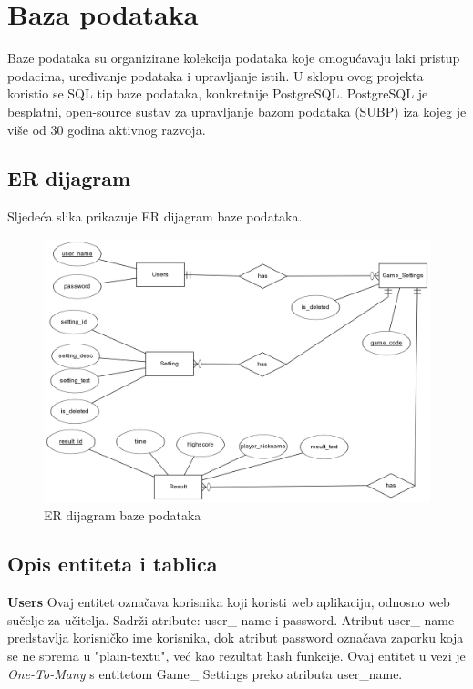 \documentclass[times, utf8, zavrsni]{fer}
\begin{document}
	

\chapter{Baza podataka}
	Baze podataka su organizirane kolekcija podataka koje omogućavaju laki pristup podacima, uređivanje podataka i upravljanje istih. U sklopu ovog projekta koristio se
	SQL tip baze podataka, konkretnije PostgreSQL. PostgreSQL je besplatni, open-source sustav za upravljanje bazom podataka (SUBP) iza kojeg je više od 30 godina aktivnog razvoja.
	
	
	\section{ER dijagram}
		Sljedeća slika prikazuje ER dijagram baze podataka.
		\begin{figure}[H]
			\includegraphics[width=\linewidth]{"slike/ER.png"} 
			\centering
			\caption{ER dijagram baze podataka}
			\label{fig:erdijagram}
		\end{figure}

	
	\section{Opis entiteta i tablica}
			\textbf {Users} \hspace{5mm}
			{Ovaj entitet označava korisnika koji koristi web aplikaciju, odnosno web sučelje za učitelja. Sadrži atribute: user\_ name i password.
			Atribut user\_ name predstavlja korisničko ime korisnika, dok atribut password označava zaporku koja se ne sprema u "plain-textu", već kao 
			rezultat hash funkcije.
			Ovaj entitet u vezi je \textit{One-To-Many} s entitetom Game\_ Settings preko atributa user\_name.}
				
\end{document}
